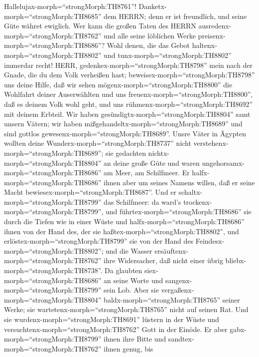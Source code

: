  Hallelujax-morph=``strongMorph:TH8761''!
Danketx-morph=``strongMorph:TH8685'' dem HERRN; denn er ist freundlich,
und seine Güte währet ewiglich.  Wer kann die großen Taten
des HERRN ausredenx-morph=``strongMorph:TH8762'' und alle seine
löblichen Werke preisenx-morph=``strongMorph:TH8686''?  Wohl
denen, die das Gebot haltenx-morph=``strongMorph:TH8802'' und
tunx-morph=``strongMorph:TH8802'' immerdar recht!  HERR,
gedenkex-morph=``strongMorph:TH8798'' mein nach der Gnade, die du dem
Volk verheißen hast; beweisex-morph=``strongMorph:TH8798'' uns deine
Hilfe,  daß wir sehen mögenx-morph=``strongMorph:TH8800''
die Wohlfahrt deiner Auserwählten und uns
freuenx-morph=``strongMorph:TH8800'', daß es deinem Volk wohl geht, und
uns rühmenx-morph=``strongMorph:TH8692'' mit deinem Erbteil.
 Wir haben gesündigtx-morph=``strongMorph:TH8804'' samt
unsern Vätern; wir haben mißgehandeltx-morph=``strongMorph:TH8689'' und
sind gottlos gewesenx-morph=``strongMorph:TH8689''.  Unsre
Väter in Ägypten wollten deine Wunderx-morph=``strongMorph:TH8737''
nicht verstehenx-morph=``strongMorph:TH8689''; sie gedachten
nichtx-morph=``strongMorph:TH8804'' an deine große Güte und waren
ungehorsamx-morph=``strongMorph:TH8686'' am Meer, am Schilfmeer.
 Er halfx-morph=``strongMorph:TH8686'' ihnen aber um seines
Namens willen, daß er seine Macht bewiesex-morph=``strongMorph:TH8687''.
 Und er schaltx-morph=``strongMorph:TH8799'' das Schilfmeer:
da ward's trockenx-morph=``strongMorph:TH8799'', und
führtex-morph=``strongMorph:TH8686'' sie durch die Tiefen wie in einer
Wüste  und halfx-morph=``strongMorph:TH8686'' ihnen von der
Hand des, der sie haßtex-morph=``strongMorph:TH8802'', und
erlöstex-morph=``strongMorph:TH8799'' sie von der Hand des
Feindesx-morph=``strongMorph:TH8802'';  und die Wasser
ersäuftenx-morph=``strongMorph:TH8762'' ihre Widersacher, daß nicht
einer übrig bliebx-morph=``strongMorph:TH8738''.  Da
glaubten siex-morph=``strongMorph:TH8686'' an seine Worte und
sangenx-morph=``strongMorph:TH8799'' sein Lob.  Aber sie
vergaßenx-morph=``strongMorph:TH8804''
baldx-morph=``strongMorph:TH8765'' seiner Werke; sie
wartetenx-morph=``strongMorph:TH8765'' nicht auf seinen Rat.
 Und sie wurdenx-morph=``strongMorph:TH8691'' lüstern in
der Wüste und versuchtenx-morph=``strongMorph:TH8762'' Gott in der
Einöde.  Er aber gabx-morph=``strongMorph:TH8799'' ihnen
ihre Bitte und sandtex-morph=``strongMorph:TH8762'' ihnen genug, bis
